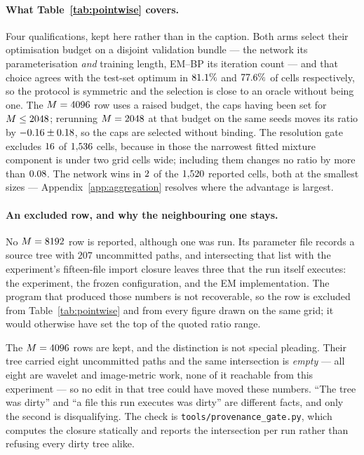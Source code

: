 \paragraph{What Table~\ref{tab:pointwise} covers.} Four qualifications, kept here rather than in
the caption. Both arms select their optimisation budget on a disjoint validation bundle --- the
network its parameterisation \emph{and} training length, EM--BP its iteration count --- and that
choice agrees with the test-set optimum in $81.1\%$ and $77.6\%$ of cells respectively,
so the protocol is symmetric and the selection is close to an oracle without being one. The
$M=4096$ row uses a raised budget, the caps having been set for
$M\le2048$; rerunning $M=2048$ at that budget on the same seeds moves its
ratio by $-0.16\pm0.18$, so the caps are selected without binding.
The resolution gate excludes $16$ of $1{,}536$ cells, because in those the
narrowest fitted mixture component is under two grid cells wide; including them changes no ratio
by more than $0.08$. The network wins in $2$ of the $1{,}520$ reported cells,
both at the smallest sizes --- Appendix~\ref{app:aggregation} resolves where the advantage is
largest.

\paragraph{An excluded row, and why the neighbouring one stays.} No $M=8192$ row is reported,
although one was run. Its parameter file records a source tree with $207$ uncommitted paths, and
intersecting that list with the experiment's fifteen-file import closure leaves three that the run
itself executes: the experiment, the frozen configuration, and the EM implementation. The program
that produced those numbers is not recoverable, so the row is excluded from
Table~\ref{tab:pointwise} and from every figure drawn on the same grid; it would otherwise have
set the top of the quoted ratio range.

The $M=4096$ rows are kept, and the distinction is not special pleading. Their tree carried
eight uncommitted paths and the same intersection is \emph{empty} --- all eight are wavelet and
image-metric work, none of it reachable from this experiment --- so no edit in that tree could have
moved these numbers. ``The tree was dirty'' and ``a file this run executes was dirty'' are
different facts, and only the second is disqualifying. The check is
\texttt{tools/provenance\_gate.py}, which computes the closure statically and reports the
intersection per run rather than refusing every dirty tree alike.

